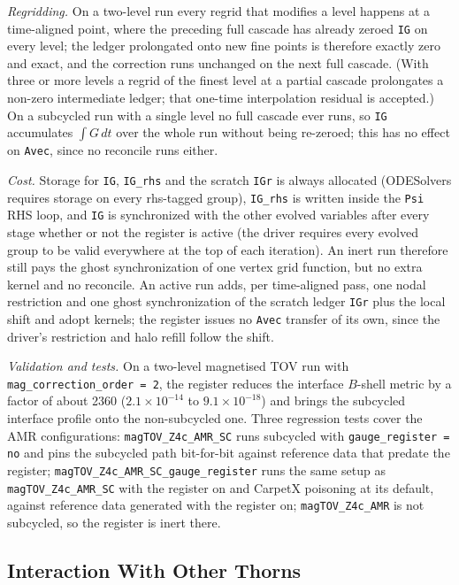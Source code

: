 \emph{Regridding.} On a two-level run every regrid that modifies a level
happens at a time-aligned point, where the preceding full cascade has already
zeroed \texttt{IG} on every level; the ledger prolongated onto new fine points
is therefore exactly zero and exact, and the correction runs unchanged on the
next full cascade. (With three or more levels a regrid of the finest level at
a partial cascade prolongates a non-zero intermediate ledger; that one-time
interpolation residual is accepted.) On a subcycled run with a single level no
full cascade ever runs, so \texttt{IG} accumulates $\int G\,dt$ over the whole
run without being re-zeroed; this has no effect on \texttt{Avec}, since no
reconcile runs either.

\emph{Cost.} Storage for \texttt{IG}, \texttt{IG\_rhs} and the scratch
\texttt{IGr} is always allocated (ODESolvers requires storage on every
rhs-tagged group), \texttt{IG\_rhs} is written inside the \texttt{Psi} RHS
loop, and \texttt{IG} is synchronized with the other evolved variables after
every stage whether or not the register is active (the driver requires every
evolved group to be valid everywhere at the top of each iteration). An inert
run therefore still pays the ghost synchronization of one vertex grid
function, but no extra kernel and no reconcile. An active run adds, per
time-aligned pass, one nodal restriction and one ghost synchronization of the
scratch ledger \texttt{IGr} plus the local shift and adopt kernels; the
register issues no \texttt{Avec} transfer of its own, since the driver's
restriction and halo refill follow the shift.

\emph{Validation and tests.} On a two-level magnetised TOV run with
\texttt{mag\_correction\_order = 2}, the register reduces the interface
$B$-shell metric by a factor of about 2360 ($2.1\times10^{-14}$ to
$9.1\times10^{-18}$) and brings the subcycled interface profile onto the
non-subcycled one. Three regression tests cover the AMR configurations:
\texttt{magTOV\_Z4c\_AMR\_SC} runs subcycled with \texttt{gauge\_register = no}
and pins the subcycled path bit-for-bit against reference data that predate
the register;
\texttt{magTOV\_Z4c\_AMR\_SC\_gauge\_register} runs the same setup as
\texttt{magTOV\_Z4c\_AMR\_SC} with the register on and CarpetX poisoning at
its default, against reference data generated with the register on;
\texttt{magTOV\_Z4c\_AMR} is not subcycled, so the register is inert there.

\subsection{Interaction With Other Thorns}

